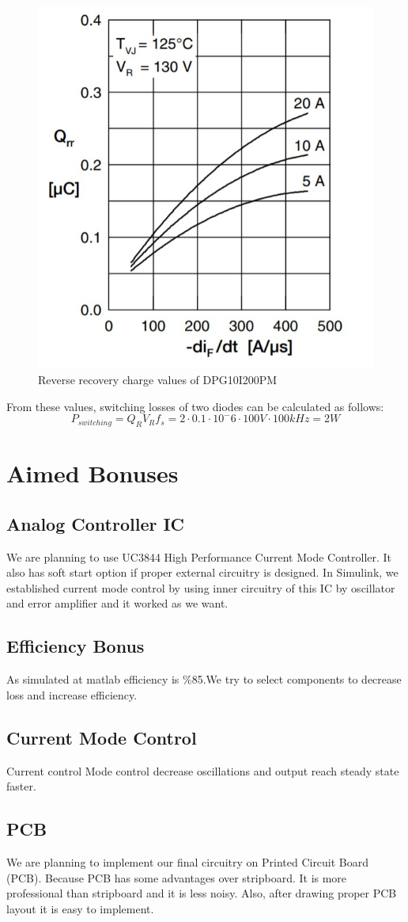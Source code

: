 \documentclass{article}
\begin{document}
\begin{figure}[H]
    \centering
    \includegraphics[width=0.5\linewidth]{diode_loss.jpeg}
    \caption {Reverse recovery charge values of DPG10I200PM}
    \label{fig:diode_loss}
\end{figure}
From these values, switching losses of two diodes can be calculated as follows:
\begin{equation}
    P_{switching}=Q_RV_Rf_s=2\cdot 0.1\cdot 10^-6\cdot 100V\cdot 100kHz=2W
\end{equation}
\section{Aimed Bonuses}
\subsection{Analog Controller IC}
We are planning to use UC3844 High Performance Current Mode Controller. It also has soft start option if proper external circuitry is designed.
In Simulink, we established current mode control by using inner circuitry of this IC by oscillator and error amplifier and it worked as we want.
\subsection{Efficiency Bonus}
As simulated at matlab efficiency is \%85.We try to select components to decrease loss and increase efficiency.
\subsection{Current Mode Control}
Current control Mode control decrease oscillations and output reach steady state faster.
\subsection{PCB}
We are planning to implement our final circuitry on Printed Circuit Board (PCB). Because PCB has some advantages over stripboard. It is more professional than stripboard and it is less noisy. Also, after drawing proper PCB layout it is easy to implement.
\end{document}
